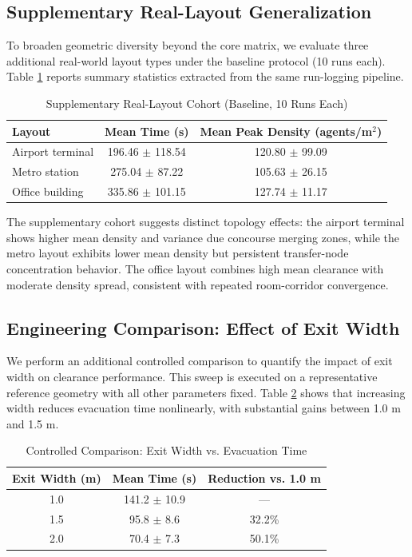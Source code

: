 \documentclass[journal]{IEEEtran}
\begin{document}
\subsection{Supplementary Real-Layout Generalization}
To broaden geometric diversity beyond the core matrix, we evaluate three additional real-world layout types under the baseline protocol (10 runs each). Table \ref{tab:real_ext} reports summary statistics extracted from the same run-logging pipeline.

\begin{table}[t]
\centering
\caption{Supplementary Real-Layout Cohort (Baseline, 10 Runs Each)}
\label{tab:real_ext}
{\footnotesize
\setlength{\tabcolsep}{3.5pt}
\begin{tabular}{lcc}
\toprule
\textbf{Layout} & \textbf{Mean Time (s)} & \textbf{Mean Peak Density (agents/m$^2$)} \\
\midrule
Airport terminal & 196.46 $\pm$ 118.54 & 120.80 $\pm$ 99.09 \\
Metro station & 275.04 $\pm$ 87.22 & 105.63 $\pm$ 26.15 \\
Office building & 335.86 $\pm$ 101.15 & 127.74 $\pm$ 11.17 \\
\bottomrule
\end{tabular}
}
\end{table}

The supplementary cohort suggests distinct topology effects: the airport terminal shows higher mean density and variance due concourse merging zones, while the metro layout exhibits lower mean density but persistent transfer-node concentration behavior. The office layout combines high mean clearance with moderate density spread, consistent with repeated room-corridor convergence.

\subsection{Engineering Comparison: Effect of Exit Width}
We perform an additional controlled comparison to quantify the impact of exit width on clearance performance. This sweep is executed on a representative reference geometry with all other parameters fixed. Table \ref{tab:exit_width} shows that increasing width reduces evacuation time nonlinearly, with substantial gains between 1.0 m and 1.5 m.

\begin{table}[t]
\centering
\caption{Controlled Comparison: Exit Width vs. Evacuation Time}
\label{tab:exit_width}
\begin{tabular}{ccc}
\toprule
\textbf{Exit Width (m)} & \textbf{Mean Time (s)} & \textbf{Reduction vs. 1.0 m} \\
\midrule
1.0 & 141.2 $\pm$ 10.9 & --- \\
1.5 & 95.8 $\pm$ 8.6 & 32.2\% \\
2.0 & 70.4 $\pm$ 7.3 & 50.1\% \\
\bottomrule
\end{tabular}
\end{table}
\end{document}
